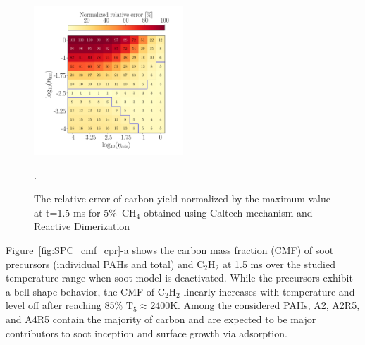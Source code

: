 \begin{figure}[H]
	\centering
	\includegraphics[width=0.5\textwidth]{Figures/Results/Shocktube/Agafonov2016_cpr/5CH4_norm_yield_error_readim.pdf}
	\caption{The relative error of carbon yield normalized by the maximum value at t=1.5 ms for 5\%~$\mathrm{CH_4}$ obtained using Caltech mechanism and Reactive Dimerization}.
	\label{fig:shockagof_yielderror_cpr} 
\end{figure}



Figure~\ref{fig:SPC_cmf_cpr}-a shows the carbon mass fraction (CMF) of soot precursors (individual PAHs and total) and $\mathrm{C_2H_2}$ at 1.5 ms over the studied temperature range when soot model is deactivated. While the precursors exhibit a bell-shape behavior, the CMF of $\mathrm{C_2H_2}$ linearly increases with temperature and level off after reaching 85\% $\mathrm{T_5\approx}$2400K. Among the considered PAHs, A2, A2R5, and A4R5 contain the majority of carbon and are expected to be major contributors to soot inception and surface growth via adsorption.

